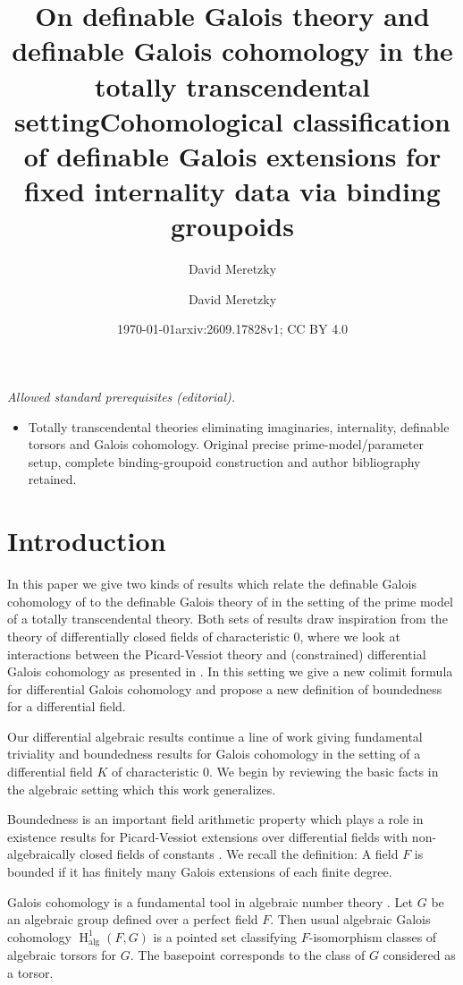 \documentclass{amsart}
\title[Definable Galois cohomology]{On definable Galois theory and definable Galois cohomology in the totally transcendental setting}
\author{David Meretzky}
\date{\today}
\title{Cohomological classification of definable Galois extensions for fixed internality data via binding groupoids}
\author{David Meretzky}
\date{arxiv:2609.17828v1; CC BY 4.0}
\theoremstyle{definition}
\theoremstyle{remark}
\numberwithin{equation}{section}
\def \HH {\operatorname{H}}
\def \alg {\operatorname{alg}}
\begin{document}
\maketitle
\noindent\textit{Allowed standard prerequisites (editorial).}\begin{itemize}
\item Totally transcendental theories eliminating imaginaries, internality, definable torsors and Galois cohomology. Original precise prime-model/parameter setup, complete binding-groupoid construction and author bibliography retained.
\end{itemize}\medskip
\section{Introduction}

In this paper we give two kinds of results which relate the definable Galois cohomology of \cite{pillay1997} to the definable Galois theory of \cite{OmarAnand} in the setting of the prime model of a totally transcendental theory. Both sets of results draw inspiration from the theory of differentially closed fields of characteristic $0$, where we look at interactions between the Picard-Vessiot theory and (constrained) differential Galois cohomology as presented in \cite{kolchin1985differential}. In this setting we give a new colimit formula for differential Galois cohomology and propose a new definition of boundedness for a differential field.  

Our differential algebraic results continue a line of work \cite{pillay_1998_DGI} 
\cite{Pillay2004}
\cite{PILLAY2017809}  \cite{Minchenko_2019} 
\cite{Chatzidakis2017GeneralizedPE}
\cite{AnandDavidComm}  giving fundamental triviality and boundedness results for Galois cohomology in the setting of a differential field $K$ of characteristic $0$. We begin by reviewing the basic facts in the algebraic setting which this work generalizes. 

Boundedness is an important field arithmetic property which plays a role in existence results for Picard-Vessiot extensions over differential fields with non-algebraically closed fields of constants \cite{KamenskyPillay}. We recall the definition: A field $F$ is bounded if it has finitely many Galois extensions of each finite degree.

Galois cohomology is a fundamental tool in algebraic number theory \cite{Serre1979}. Let $G$ be an algebraic group defined over a perfect field $F$. Then usual algebraic Galois cohomology $\HH^1_{\alg}(F,G)$ is a pointed set classifying $F$-isomorphism classes of algebraic torsors for $G$. The basepoint corresponds to the class of $G$ considered as a torsor. 
\end{document}
